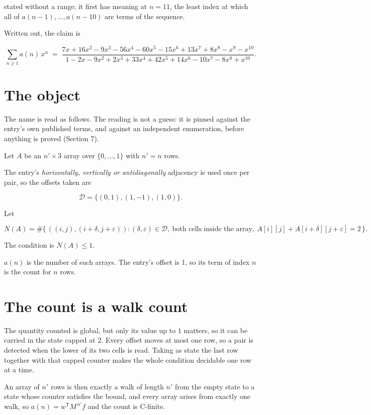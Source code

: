 \documentclass[11pt]{article}
\theoremstyle{definition}
\begin{document}
stated without a range; it first has meaning at $n = 11$, the least index at which all of $a(n-1),\dots,a(n-10)$ are terms of the sequence.

Written out, the claim is

\[\sum_{n \ge 1} a(n)\,x^n \;=\; \frac{7x + 16x^{2} - 9x^{3} - 56x^{4} - 60x^{5} - 15x^{6} + 13x^{7} + 8x^{8} - x^{9} - x^{10}}{1 - 2x - 9x^{2} + 2x^{3} + 33x^{4} + 42x^{5} + 14x^{6} - 10x^{7} - 8x^{8} + x^{10}}.\]

\section{The object}

The name is read as follows. The reading is not a guess: it is pinned against the entry's own published terms, and against an independent enumeration, before anything is proved (Section 7).

Let $A$ be an $n' \times 3$ array over $\{0,\dots,1\}$ with $n' = n$ rows.

The entry's {\itshape horizontally, vertically or antidiagonally} adjacency is used once per pair, so the offsets taken are

\[\mathcal{D} = \{(0,1), (1,-1), (1,0)\}.\]

Let

\[N(A) = \#\bigl\{\,((i,j),(i{+}\delta,j{+}\varepsilon)) : (\delta,\varepsilon) \in \mathcal{D},\ \text{both cells inside the array},\ A[i][j] + A[i{+}\delta][j{+}\varepsilon] = 2\,\bigr\}.\]

The condition is $N(A) \le 1$.

$a(n)$ is the number of such arrays. The entry's offset is 1, so its term of index $n$ is the count for $n$ rows.

\section{The count is a walk count}

The quantity counted is global, but only its value up to $1$ matters, so it can be carried in the state capped at $2$. Every offset moves at most one row, so a pair is detected when the lower of its two cells is read. Taking as state the last row together with that capped counter makes the whole condition decidable one row at a time.

An array of $n'$ rows is then exactly a walk of length $n'$ from the empty state to a state whose counter satisfies the bound, and every array arises from exactly one walk, so $a(n) = w^{\mathsf T}M^{\,n'}f$ and the count is C-finite.
\end{document}

